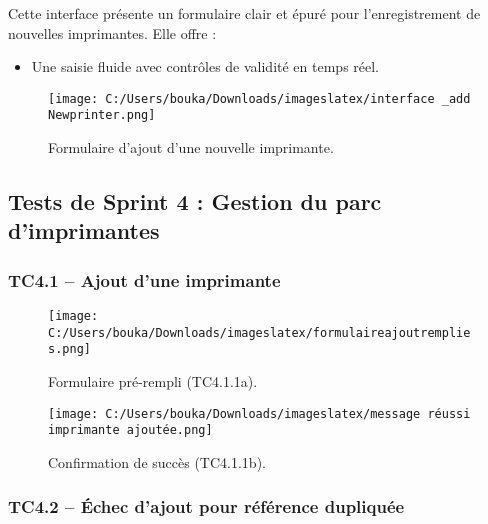 \documentclass[a4paper,11pt]{report}
\begin{document}
\newpage
\begin{tcolorbox}[
  enhanced,
  colback=blue!5,
  colframe=blue!75!black,
  boxrule=1pt,
  arc=4pt,
  title=\large\bfseries Interface : Ajouter Imprimante
]
\vspace{-1ex}
\noindent
Cette interface présente un formulaire clair et épuré pour l’enregistrement de nouvelles imprimantes.  
Elle offre :
\begin{itemize}[label=\raisebox{0.2ex}{\tiny\textbullet}, left=1em]
  \item Une saisie fluide avec contrôles de validité en temps réel.
\end{itemize}

\begin{figure}[H]
  \centering
  \texttt{[image: C:/Users/bouka/Downloads/imageslatex/interface \_add Newprinter.png]}
  \caption{Formulaire d’ajout d’une nouvelle imprimante.}
  \label{fig:ajouter-imprimante}
\end{figure}
\end{tcolorbox}


\newpage
\subsection{Tests de Sprint 4 : Gestion du parc d’imprimantes}

\subsubsection*{TC4.1 – Ajout d’une imprimante}

\begin{figure}[H]
  \centering
  \texttt{[image: C:/Users/bouka/Downloads/imageslatex/formulaireajoutremplies.png]}
  \caption{Formulaire pré-rempli (TC4.1.1a).}
  \label{fig:add-form-filled}
\end{figure}

\begin{figure}[H]
  \centering
  \texttt{[image: C:/Users/bouka/Downloads/imageslatex/message réussi imprimante ajoutée.png]}
  \caption{Confirmation de succès (TC4.1.1b).}
  \label{fig:add-success}
\end{figure}


\subsubsection*{TC4.2 – Échec d’ajout pour référence dupliquée}
\end{document}
